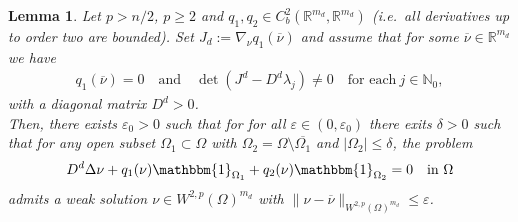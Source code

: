 \documentclass[12pt, a4paper]{amsart}
\numberwithin{equation}{section}
\newcommand{\RR}{\mathbb{R}}
\newcommand{\NN}{\mathbb{N}}
\newcommand{\md}{m_{d}}  %
\newenvironment{nalign}
{\begin{equation}\begin{aligned}}
		{\end{aligned}\end{equation}\ignorespacesafterend}
\newtheorem{lemma}[theorem]{\bf Lemma}
\begin{document}
\begin{lemma}
	\label{DisTheorem1}
	Let $p>n/2$, $p\geqslant 2$ and $q_1, q_2 \in C_b^2(\RR^{\md},\RR^{\md})$ {\rm (}\textit{i.e.}\ all derivatives up to order two are bounded{\rm )}. 
    Set $J_d:=\nabla_\nu q_1(\overline{\nu})$ and assume that for some $\overline{\nu} \in \RR^{\md}$ we have  
	\begin{nalign}
		q_1(\overline{\nu}) = 0 \quad \text{and} \quad \det\left(J^d - D^d \lambda_j\right)\neq 0 \quad \text{for each} \ j\in\NN_0,
	\end{nalign} 
    with a diagonal matrix $D^d>0$.\\
    Then, there exists $\varepsilon_0>0$ such that for for all $\varepsilon\in(0,\varepsilon_0)$ there exits  $\delta>0$ such that for any open subset $\Omega_1\subset \Omega$ with \mbox{$\Omega_2 = \Omega\setminus\overline{\Omega_1}$} and $|\Omega_2| \le \delta$, the problem
	\begin{nalign}
		\label{DisDefSingle}
		D^d\Delta \nu + q_1({\nu}) \mathbbm{1}_{\Omega_1} + q_2({\nu}) \mathbbm{1}_{\Omega_2} = 0 \quad \text{in}\ \Omega
	\end{nalign}
	admits a weak solution $ \nu\in W^{2,p}(\Omega)^{\md}$ with $\|\nu-\overline{\nu}\|_{W^{2,p}(\Omega)^{m_d}}\leqslant \varepsilon$. 
\end{lemma}
\end{document}
